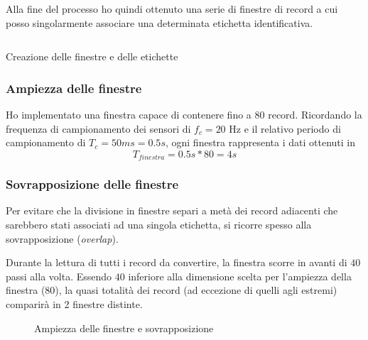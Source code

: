 Alla fine del processo ho quindi ottenuto una serie di finestre di record a cui posso singolarmente associare una determinata
etichetta identificativa.

\vfill
\begin{listing}[H] 
    \inputminted[frame=single,framesep=10pt]{python}{assets/snippets/classifier/create_segments_and_labels.py}
    \caption{Creazione delle finestre e delle etichette}
\end{listing}

\subsubsection{Ampiezza delle finestre}
Ho implementato una finestra capace di contenere fino a $80$ record. Ricordando la frequenza di 
campionamento dei sensori di $f_c = 20$ Hz e il relativo periodo di campionamento di $T_c = 50ms = 0.5s$, ogni finestra rappresenta i dati ottenuti in 
$$T_{finestra} = 0.5s * 80 = 4s$$

\subsubsection{Sovrapposizione delle finestre}
Per evitare che la divisione in finestre separi a metà dei record adiacenti che sarebbero stati associati 
ad una singola etichetta, si ricorre spesso alla sovrapposizione (\textit{overlap}).

Durante la lettura di tutti i record da convertire, la finestra scorre in avanti 
di $40$ passi alla volta. Essendo $40$ inferiore alla dimensione scelta per l'ampiezza della finestra ($80$), 
la quasi totalità dei record (ad eccezione di quelli agli estremi) comparirà in 2 finestre distinte.

\vfill
\begin{figure}[H]
    \centering
    
    \caption{Ampiezza delle finestre e sovrapposizione}
    \label{fig:overlay}
\end{figure}


\newpage
